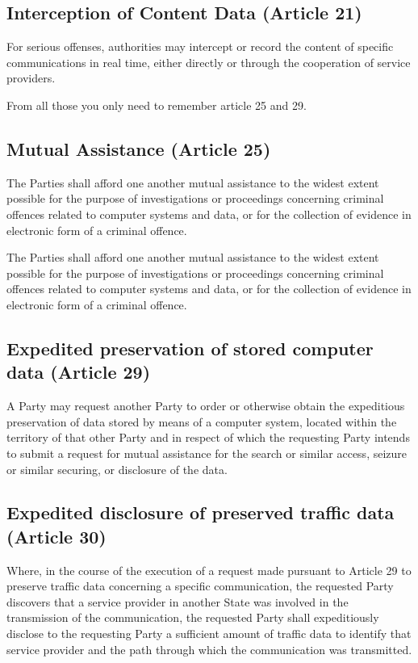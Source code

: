 \subsection{Interception of Content Data (Article 21)}
For serious offenses, authorities may intercept or record the content
of specific communications in real time, either directly or through
the cooperation of service providers.

\begin{boxH}
  From all those you only need to remember article 25 and 29.
\end{boxH}

\subsection{Mutual Assistance (Article 25)}
The Parties shall afford one another mutual assistance to the widest
extent possible for the purpose of investigations or proceedings
concerning criminal offences related to computer systems and data, or
for the collection of evidence in electronic form of a criminal
offence.

The Parties shall afford one another mutual assistance to the widest
extent possible for the purpose of investigations or proceedings
concerning criminal offences related to computer systems and data, or
for the collection of evidence in electronic form of a criminal
offence.

\subsection{Expedited preservation of stored computer data (Article
29)}
A Party may request another Party to order or otherwise obtain the
expeditious preservation of data stored by means of a computer system,
located within the territory of that other Party and in respect of
which the requesting Party intends to submit a request for mutual
assistance for the search or similar access, seizure or similar
securing, or disclosure of the data.

\subsection{Expedited disclosure of preserved traffic data (Article
30)}
Where, in the course of the execution of a request made pursuant to
Article 29 to preserve traffic data concerning a specific
communication, the requested Party discovers that a service provider
in another State was involved in the transmission of the
communication, the requested Party shall expeditiously disclose to the
requesting Party a sufficient amount of traffic data to identify that
service provider and the path through which the communication was
transmitted.

